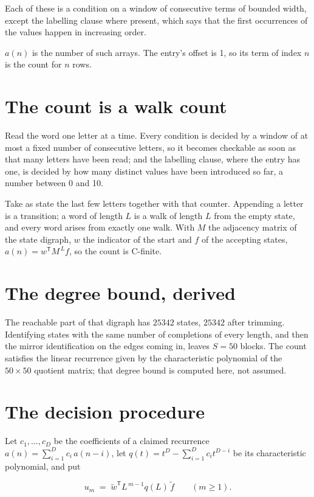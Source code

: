 \documentclass[11pt]{article}
\theoremstyle{definition}
\begin{document}
Each of these is a condition on a window of consecutive terms of bounded width, except the labelling clause where present, which says that the first occurrences of the values happen in increasing order.

$a(n)$ is the number of such arrays. The entry's offset is 1, so its term of index $n$ is the count for $n$ rows.

\section{The count is a walk count}

Read the word one letter at a time. Every condition is decided by a window of at most a fixed number of consecutive letters, so it becomes checkable as soon as that many letters have been read; and the labelling clause, where the entry has one, is decided by how many distinct values have been introduced so far, a number between $0$ and 10.

Take as state the last few letters together with that counter. Appending a letter is a transition; a word of length $L$ is a walk of length $L$ from the empty state, and every word arises from exactly one walk. With $M$ the adjacency matrix of the state digraph, $w$ the indicator of the start and $f$ of the accepting states, $a(n) = w^{\mathsf T}M^{\,L}f$, so the count is C-finite.

\section{The degree bound, derived}

The reachable part of that digraph has $25342$ states, $25342$ after trimming. Identifying states with the same number of completions of every length, and then the mirror identification on the edges coming in, leaves $S = 50$ blocks. The count satisfies the linear recurrence given by the characteristic polynomial of the $50\times50$ quotient matrix; that degree bound is computed here, not assumed.

\section{The decision procedure}

Let $c_1,\dots,c_D$ be the coefficients of a claimed recurrence $a(n) = \sum_{i=1}^{D} c_i\,a(n-i)$, let $q(t) = t^{D} - \sum_{i=1}^{D} c_i t^{D-i}$ be its characteristic polynomial, and put

\[u_m \;=\; \tilde w^{\mathsf T} L^{\,m-1} q(L)\,\tilde f \qquad (m \ge 1).\]
\end{document}

